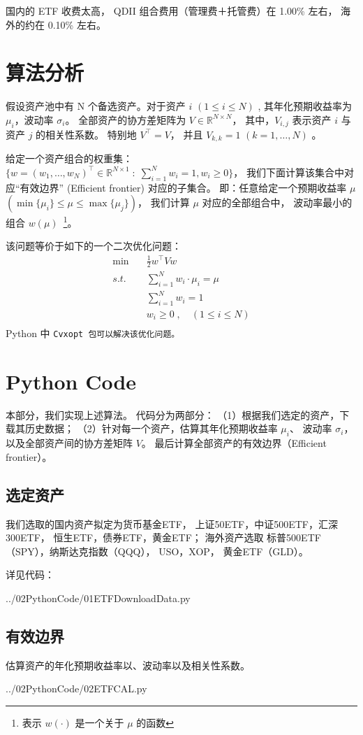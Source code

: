 \documentclass[a4paper, 11pt, UTF8]{report}
\begin{document}
国内的 ETF 收费太高，
QDII 组合费用（管理费＋托管费）在 1.00\% 左右，
海外的约在 0.10\% 左右。

\section{算法分析} 

假设资产池中有 N 个备选资产。对于资产 $i$ $(1 \le i \le N)$ ,
其年化预期收益率为$\mu_i$，波动率 $\sigma_i$。
全部资产的协方差矩阵为 $V \in \mathbb{R}^{N\times N}$，
其中，$V_{i,j}$ 表示资产 $i$ 与资产 $j$ 的相关性系数。 
特别地 $V^\top = V$，
并且 $V_{k,k} = 1$ $(k=1, \ldots, N)$ 。

给定一个资产组合的权重集：
$\{w = (w_1, \ldots, w_N)^\top \in \mathbb{R}^{N\times 1}
        \;\colon\; \sum^N_{i=1} w_i = 1, w_i \ge 0 \}$，
我们下面计算该集合中对应“有效边界” (Efficient frontier) 对应的子集合。
即：任意给定一个预期收益率 $\mu$
$( \min\{\mu_i\} \le \mu \le \max\{\mu_j\} )$，
我们计算 $\mu$ 对应的全部组合中，
波动率最小的组合
$w(\mu)$~\footnote{表示 $w(\cdot)$ 是一个关于 $\mu$ 的函数}。

该问题等价于如下的一个二次优化问题：
\begin{align*}
        \min \quad & \frac{1}{2} w^\top V w \\
        s.t.\quad  & \sum^N_{i=1} w_i \cdot \mu_i = \mu \\
                   & \sum^N_{i=1} w_i = 1 \\
                   & w_i \ge 0 \;,  \quad (1 \le i \le N) \\
\end{align*}
Python 中 \tt{Cvxopt} 包可以解决该优化问题。

\section{Python Code}
本部分，我们实现上述算法。
代码分为两部分：
（1）根据我们选定的资产，下载其历史数据；
（2）针对每一个资产，估算其年化预期收益率 $\mu_i$、
波动率 $\sigma_i$， 
以及全部资产间的协方差矩阵 $V$。
最后计算全部资产的有效边界（Efficient frontier）。

\subsection{选定资产}

我们选取的国内资产拟定为货币基金ETF，
上证50ETF，中证500ETF，汇深300ETF，
恒生ETF，债券ETF，黄金ETF；
海外资产选取
标普500ETF（SPY），纳斯达克指数（QQQ），
USO，XOP，
黄金ETF（GLD）。

详见代码：


                {../02PythonCode/01ETFDownloadData.py}


\newpage
\subsection{有效边界}

估算资产的年化预期收益率以、波动率以及相关性系数。


                {../02PythonCode/02ETFCAL.py}
\end{document}
